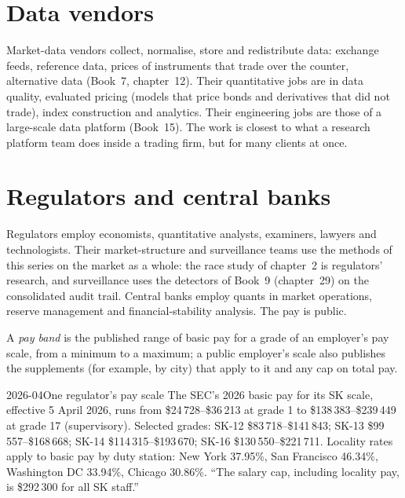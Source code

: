 \section{Data vendors}

Market-data vendors collect, normalise, store and redistribute data: exchange feeds, reference data, prices of
instruments that trade over the counter, alternative data (Book~7, chapter~12). Their quantitative jobs are in data
quality, evaluated pricing (models that price bonds and derivatives that did not trade), index construction and
analytics. Their engineering jobs are those of a large-scale data platform (Book~15). The work is closest to what a
research platform team does inside a trading firm, but for many clients at once.

\section{Regulators and central banks}

Regulators employ economists, quantitative analysts, examiners, lawyers and technologists. Their market-structure and
surveillance teams use the methods of this series on the market as a whole: the race study of chapter~2 is regulators'
research, and surveillance uses the detectors of Book~9 (chapter~29) on the consolidated audit trail. Central banks
employ quants in market operations, reserve management and financial-stability analysis. The pay is public.

\begin{definition}\label{def:in:exchanges-brokers-vendors-and-regulators-as-employers:band}
A \emph{pay band} is the published range of basic pay for a grade of an employer's pay scale, from a
minimum to a maximum; a public employer's scale also publishes the supplements (for example, by city) that apply to it
and any cap on total pay.
\end{definition}

\begin{dated}{2026-04}{One regulator's pay scale}\label{dat:in:exchanges-brokers-vendors-and-regulators-as-employers:sec}
The SEC's 2026 basic pay for its SK scale, effective 5 April 2026, runs from \$24\,728--\$36\,213 at grade 1 to
\$138\,383--\$239\,449 at grade 17 (supervisory). Selected grades: SK-12 \$83\,718--\$141\,843; SK-13 \$99\,557--\$168\,668;
SK-14 \$114\,315--\$193\,670; SK-16 \$130\,550--\$221\,711. Locality rates apply to basic pay by duty station: New York
37.95\%, San Francisco 46.34\%, Washington DC 33.94\%, Chicago 30.86\%. ``The salary cap, including locality pay, is
\$292\,300 for all SK staff.''
\end{dated}

